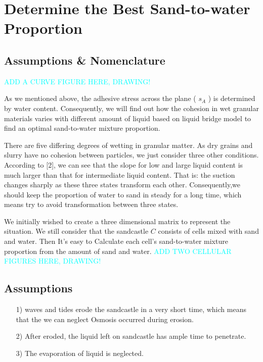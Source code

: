\documentclass[12pt]{article}
\begin{document}
\section{Determine the Best Sand-to-water Proportion}
\subsection{Assumptions \& Nomenclature}
\textcolor{cyan}{ADD A CURVE FIGURE HERE, DRAWING!}
\par
As we mentioned above, the adhesive stress across the plane ( $s_A$ ) is determined by water content. Consequently, we will find out how the cohesion in wet granular materials varies with different amount of liquid based on liquid bridge model to find an optimal sand-to-water mixture proportion.
\par
There are five differing degrees of wetting in granular matter. As dry grains and slurry have no cohesion between particles, we just consider three other conditions. According to [2], we can see that the slope for low and large liquid content is much larger than that for intermediate liquid content. That is: the suction changes sharply as these three states transform each other. Consequently,we should keep the proportion of water to sand in steady for a long time, which means try to avoid transformation between three states.
\par
We initially wished to create a three dimensional matrix to represent the situation. We still consider that the sandcastle $C$ consists of cells mixed with sand and water. Then It's easy to Calculate each cell’s sand-to-water mixture proportion from the amount of sand and water.
\textcolor{cyan}{ADD TWO CELLULAR FIGURES HERE, DRAWING!}
\subsection{Assumptions}
\begin{itemize}
    \item [1)]
          waves and tides erode the sandcastle in a very short time, which means that the we can neglect Osmosis occurred during erosion.
    \item [2)]
          After eroded, the liquid left on sandcastle has ample time to penetrate.
    \item [3)]
          The evaporation of liquid is neglected.
\end{itemize}
\end{document}
